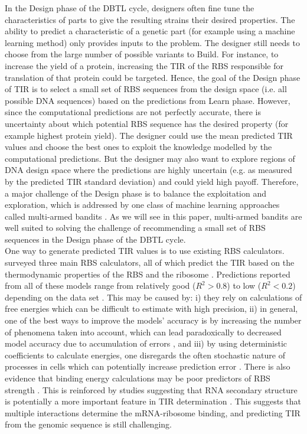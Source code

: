 \documentclass{scrartcl}[2013/05/29]%
\begin{document}
In the Design phase of the DBTL cycle, designers often fine tune the characteristics of parts to give the resulting strains their desired properties. The ability to predict a characteristic of a genetic part (for example using a machine
learning method) only provides inputs to the problem. The designer still needs to choose from the large number of
possible variants to Build.
For instance, to increase the yield of a protein, increasing the TIR of the RBS responsible for translation of that protein could be targeted.
Hence, the goal of the Design phase of TIR is to select a small set of RBS sequences from the design space (i.e. all possible DNA sequences) based on the predictions from Learn phase.
However, since the computational predictions are not perfectly accurate,
there is uncertainty about which potential RBS sequence has the desired
property (for example highest protein yield).
The designer could use the mean predicted TIR values and choose the best
ones to exploit the knowledge modelled by the computational predictions.
But the designer may also want to explore regions of DNA design space where the predictions are highly uncertain (e.g. as measured by
the predicted TIR standard deviation) and could yield high payoff.
Therefore, a major challenge of the Design phase is to balance the exploitation and exploration, which is addressed by one class of machine learning approaches called multi-armed bandits \cite{lattimore2020bandit}.
As we will see in this paper, multi-armed bandits are well suited to solving the challenge of recommending a small set of RBS sequences in the Design phase of the DBTL cycle.
\\

One way to generate predicted TIR values is to use existing RBS calculators.
\textcite{Reeve2014} surveyed three main RBS calculators, all of which predict the TIR based on the thermodynamic properties of the RBS and the ribosome \cite{Seo2013,Na2010,Salis2009}.
Predictions reported from all of these models range from relatively good ($R^2 >0.8$) to low ($R^2 <0.2$) depending on the data set \cite{Reis2020}.
This may be caused by:
i) they rely on calculations of free energies which can be difficult to estimate with high precision,
ii) in general, one of the best ways to improve the models' accuracy is by increasing the number of phenomena taken into account, which can lead paradoxically to decreased model accuracy due to accumulation of errors \cite{EspahBorujeni2016}, and
iii) by using deterministic coefficients to calculate energies, one disregards the often stochastic nature of processes in cells which can potentially increase prediction error \cite{Goss1998}.
There is also evidence that binding energy calculations may be poor predictors of RBS strength \cite{Saito2020,Sherer1980}.
This is reinforced by studies suggesting that RNA secondary structure is potentially a more important feature in TIR determination \cite{DESMIT1994,EspahBorujeni2016}.
This suggests that multiple interactions determine the mRNA-ribosome binding, and predicting TIR from the genomic sequence is still challenging.\\
\end{document}
